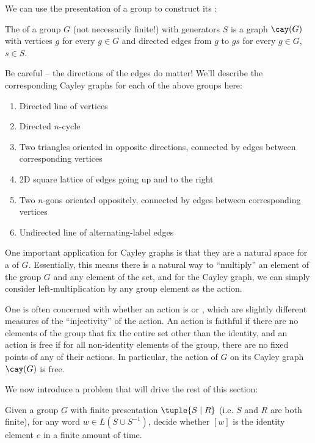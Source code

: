\documentclass[12pt]{article}
\begin{document}
We can use the presentation of a group to construct its : 
\begin{definition*}
  The  of a group $G$ (not necessarily finite!) with generators $S$ 
  is a graph $\cay(G)$ with vertices $g$ for every $g \in G$ and directed edges
  from $g$ to $gs$ for every $g \in G$, $s \in S$.  
\end{definition*}
Be careful -- the directions of the edges do matter! We'll describe the
corresponding Cayley graphs for each of the above groups here:
\begin{multicols}{2}
\begin{enumerate}[label=(\alph*)]
  \item Directed line of vertices 
  \item Directed $n$-cycle
  \item Two triangles oriented in opposite directions, connected by edges between
    corresponding vertices
  \item 2D square lattice of edges going up and to the right
  \item Two $n$-gons oriented oppositely, connected by edges between
    corresponding vertices
  \item Undirected line of alternating-label edges 
\end{enumerate}  
\end{multicols}

\begin{remark}
One important application for Cayley graphs is that they are a natural space
for a  of $G$. Essentially, this means there is a natural way
to ``multiply'' an element of the group $G$ and any element of the set, and for
the Cayley graph, we can simply consider left-multiplication by any group
element as the action.

One is often concerned with whether an action is  or ,
which are slightly different measures of the ``injectivity'' of the action. An
action is faithful if there are no elements of the group that fix the entire set
other than the identity, and an action is free if for all non-identity elements
of the group, there are no fixed points of any of their actions. In particular,
the action of $G$ on its Cayley graph $\cay(G)$ is free. 
\end{remark}

We now introduce a problem that will drive the rest of this section:
\begin{problem}
  Given a group $G$ with finite presentation $\tuple{S \mid R}$ (i.e. $S$ and
  $R$ are both finite), for any word $w \in L(S \cup S^{-1})$, decide
  whether $[w]$ is the identity element $e$ in a finite amount of time.   
\end{problem}
\end{document}

